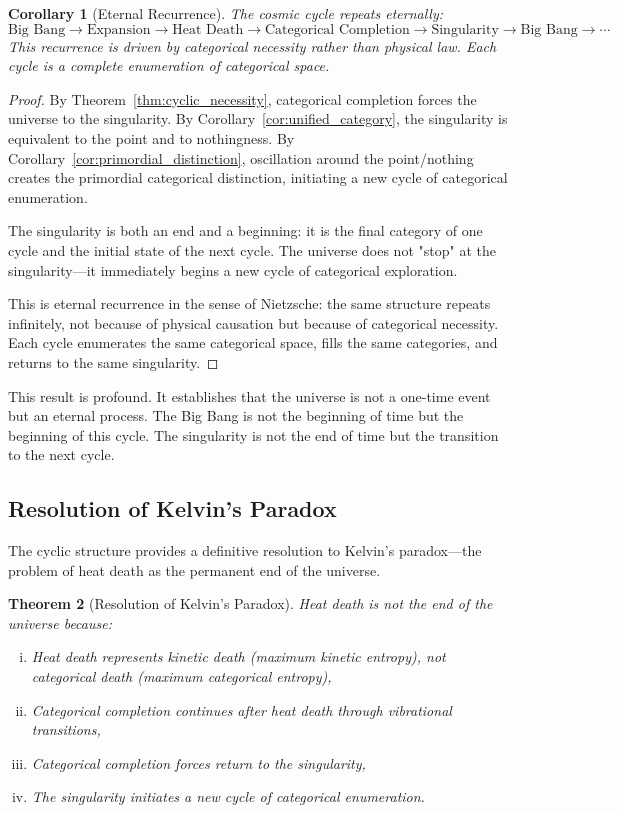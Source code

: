 \documentclass[12pt,a4paper]{article}
\newtheorem{theorem}{Theorem}[section]
\newtheorem{corollary}[theorem]{Corollary}
\theoremstyle{definition}
\theoremstyle{remark}
\begin{document}
\begin{corollary}[Eternal Recurrence]
\label{cor:eternal_recurrence}
The cosmic cycle repeats eternally:
\begin{equation}
\text{Big Bang} \to \text{Expansion} \to \text{Heat Death} \to \text{Categorical Completion} \to \text{Singularity} \to \text{Big Bang} \to \cdots
\end{equation}
This recurrence is driven by categorical necessity rather than physical law. Each cycle is a complete enumeration of categorical space.
\end{corollary}

\begin{proof}
By Theorem~\ref{thm:cyclic_necessity}, categorical completion forces the universe to the singularity. By Corollary~\ref{cor:unified_category}, the singularity is equivalent to the point and to nothingness. By Corollary~\ref{cor:primordial_distinction}, oscillation around the point/nothing creates the primordial categorical distinction, initiating a new cycle of categorical enumeration.

The singularity is both an end and a beginning: it is the final category of one cycle and the initial state of the next cycle. The universe does not "stop" at the singularity—it immediately begins a new cycle of categorical exploration.

This is eternal recurrence in the sense of Nietzsche: the same structure repeats infinitely, not because of physical causation but because of categorical necessity. Each cycle enumerates the same categorical space, fills the same categories, and returns to the same singularity.
\end{proof}

This result is profound. It establishes that the universe is not a one-time event but an eternal process. The Big Bang is not the beginning of time but the beginning of this cycle. The singularity is not the end of time but the transition to the next cycle.

\subsection{Resolution of Kelvin's Paradox}

The cyclic structure provides a definitive resolution to Kelvin's paradox—the problem of heat death as the permanent end of the universe.

\begin{theorem}[Resolution of Kelvin's Paradox]
\label{thm:kelvin_resolution}
Heat death is not the end of the universe because:
\begin{enumerate}[(i)]
    \item Heat death represents kinetic death (maximum kinetic entropy), not categorical death (maximum categorical entropy),
    \item Categorical completion continues after heat death through vibrational transitions,
    \item Categorical completion forces return to the singularity,
    \item The singularity initiates a new cycle of categorical enumeration.
\end{enumerate}
\end{theorem}
\end{document}
